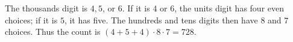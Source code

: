 The thousands digit is $4,5$, or $6$. If it is $4$ or $6$, the units digit has four even choices; if it is $5$, it has five. The hundreds and tens digits then have $8$ and $7$ choices. Thus the count is $(4+5+4)\cdot8\cdot7=\boxed{728}$.
